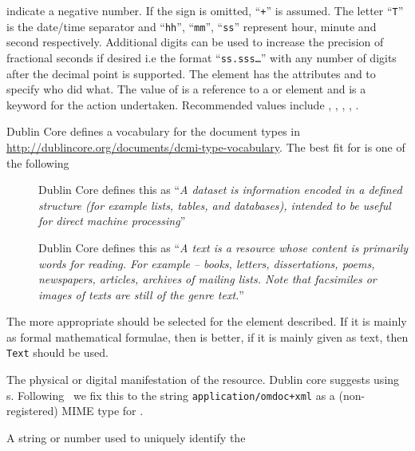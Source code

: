 \begin{description}
  indicate a negative number. If the sign is omitted, ``{\tt{+}}'' is assumed.
  The letter ``{\tt{T}}'' is the date/time separator and ``{\tt{hh}}'',
  ``{\tt{mm}}'', ``{\tt{ss}}'' represent hour, minute and second respectively.
  Additional digits can be used to increase the precision of fractional seconds if
  desired i.e the format ``{\tt{ss.sss\ldots}}'' with any number of digits after
  the decimal point is supported.  The {} element has the attributes
  {} and {} to specify who did what.
  The value of {} is a reference to a {} or
  {} element and {} is a keyword for
  the action undertaken. Recommended values include
  {}, {},
  {}, {},
  {}.
\item[{\eldef{Type}}] Dublin Core defines a vocabulary for the document types in
  {\url{http://dublincore.org/documents/dcmi-type-vocabulary}}. The best fit for
  {\omdoc} is one of the following 
  \begin{description}
  \item[{}] Dublin
    Core defines this as ``{\em A dataset is information encoded in a defined
      structure (for example lists, tables, and databases), intended to be useful
      for direct machine processing}''
  \item[{}] Dublin Core
    defines this as ``{\em A text is a resource whose content is primarily words
      for reading. For example -- books, letters, dissertations, poems,
      newspapers, articles, archives of mailing lists. Note that facsimiles or
      images of texts are still of the genre text.}''
  \end{description}
  The more appropriate should be selected for the element described. If it is
  mainly as formal mathematical formulae, then {} is better, if it is
  mainly given as text, then {\tt{Text}} should be used.
\item[{\eldef{Format}}] The physical or digital manifestation of the resource.
  Dublin core suggests using {s}.
  Following~\cite{MurLau:xmt01} we fix this to the string
  {\tt{application/omdoc+xml}} as a (non-registered) MIME type for {\omdoc}.
\item[{\eldef{Identifier}}] A string or number used to uniquely identify the

\end{description}
